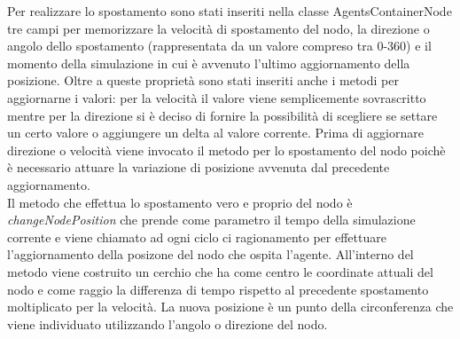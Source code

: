 \documentclass[12pt,a4paper,openright,twoside]{report}
\begin{document}
Per realizzare lo spostamento sono stati inseriti nella classe AgentsContainerNode tre campi per memorizzare la velocit\`a di spostamento del nodo, la direzione o angolo dello spostamento (rappresentata da un valore compreso tra 0-360) e il momento della simulazione in cui \`e avvenuto l'ultimo aggiornamento della posizione.
Oltre a queste propriet\`a sono stati inseriti anche i metodi per aggiornarne i valori: per la velocit\`a il valore viene semplicemente sovrascritto mentre per la direzione si \`e deciso di fornire la possibilit\`a di scegliere se settare un certo valore o aggiungere un delta al valore corrente. Prima di aggiornare direzione o velocit\`a viene invocato il metodo per lo spostamento del nodo poich\`e \`e necessario attuare la variazione di posizione avvenuta dal precedente aggiornamento.
\\
Il metodo che effettua lo spostamento vero e proprio del nodo \`e \textit{changeNodePosition} che prende come parametro il tempo della simulazione corrente e viene chiamato ad ogni ciclo ci ragionamento per effettuare l'aggiornamento della posizone del nodo che ospita l'agente. All'interno del metodo viene costruito un cerchio che ha come centro le coordinate attuali del nodo e come raggio la differenza di tempo rispetto al precedente spostamento moltiplicato per la velocit\`a. La nuova posizione \`e un punto della circonferenza che viene individuato utilizzando l'angolo o direzione del nodo.

\bigskip
\end{document}
